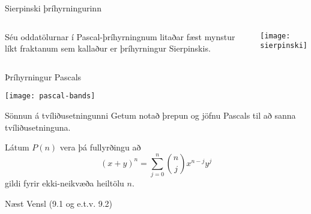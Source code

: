\documentclass{beamer}
\begin{document}
\begin{frame}{Sierpinski þríhyrningurinn}
    \begin{columns}
        Séu oddatölurnar í Pascal-þríhyrningnum litaðar fæst mynstur líkt fraktanum sem kallaður er þríhyrningur Sierpinskis.
        \begin{center}
            \texttt{[image: sierpinski]}
        \end{center}    
    \end{columns}
\end{frame}
    
\begin{frame}{Þríhyrningur Pascals}
    \begin{center}
        \texttt{[image: pascal-bands]}
    \end{center}
\end{frame}

\begin{frame}{Sönnun á tvíliðusetningunni}
    Getum notað þrepun og jöfnu Pascals til að sanna tvíliðusetninguna.

    \vspace{1cm}
    Látum $P(n)$ vera þá fullyrðingu að \[(x + y)^n = \sum_{j=0}^n \binom{n}{j} x^{n-j} y^j\] gildi fyrir ekki-neikvæða heiltölu $n$.
\end{frame}

\begin{frame}{Næst}
Vensl (9.1 og e.t.v. 9.2)
\end{frame}
\end{document}
